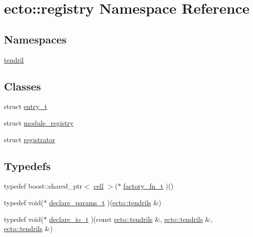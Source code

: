 \hypertarget{namespaceecto_1_1registry}{\section{ecto\-:\-:registry Namespace Reference}
\label{namespaceecto_1_1registry}
}
\subsection*{Namespaces}
\begin{DoxyCompactItemize}
\item 
\hyperlink{namespaceecto_1_1registry_1_1tendril}{tendril}
\end{DoxyCompactItemize}
\subsection*{Classes}
\begin{DoxyCompactItemize}
\item 
struct \hyperlink{structecto_1_1registry_1_1entry__t}{entry\-\_\-t}
\item 
struct \hyperlink{structecto_1_1registry_1_1module__registry}{module\-\_\-registry}
\item 
struct \hyperlink{structecto_1_1registry_1_1registrator}{registrator}
\end{DoxyCompactItemize}
\subsection*{Typedefs}
\begin{DoxyCompactItemize}
\item 
typedef boost\-::shared\-\_\-ptr$<$ \hyperlink{structecto_1_1cell}{cell} $>$($\ast$ \hyperlink{namespaceecto_1_1registry_a3f75a16f135bcadb9bf1a7000b807b3b}{factory\-\_\-fn\-\_\-t} )()
\item 
typedef void($\ast$ \hyperlink{namespaceecto_1_1registry_a04d849b45313a8ce9a602095e1edade9}{declare\-\_\-params\-\_\-t} )(\hyperlink{classecto_1_1tendrils}{ecto\-::tendrils} \&)
\item 
typedef void($\ast$ \hyperlink{namespaceecto_1_1registry_af52d8f0fff3baaf352e2523ab8ed7977}{declare\-\_\-io\-\_\-t} )(const \hyperlink{classecto_1_1tendrils}{ecto\-::tendrils} \&, \hyperlink{classecto_1_1tendrils}{ecto\-::tendrils} \&, \hyperlink{classecto_1_1tendrils}{ecto\-::tendrils} \&)
\end{DoxyCompactItemize}
